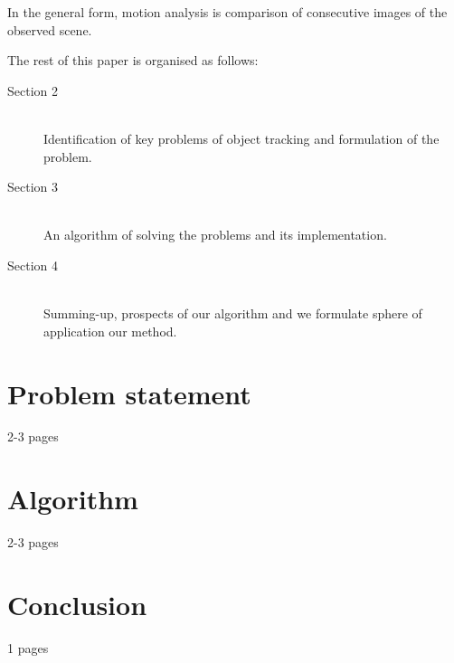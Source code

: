 \documentclass[12pt,a4paper,oneside,titlepage]{article}
\begin{document}
In the general form, motion analysis is comparison of consecutive images of the observed scene.

The rest of this paper is organised as follows:
\begin{description}
  \item[Section 2] \hfill \\
  Identification of key problems of object tracking and formulation of the problem.
  \item[Section 3] \hfill \\
  An algorithm of solving the problems and its implementation. 
  \item[Section 4] \hfill \\
  Summing-up, prospects of our algorithm and we formulate sphere of application our method.
\end{description}

\newpage
\section*{Problem statement}
2-3 pages



\newpage
\section*{Algorithm}
2-3 pages



\newpage
\section*{Conclusion}
1 pages
%


\newpage
\renewcommand\refname{Bibliography}


\end{document}
